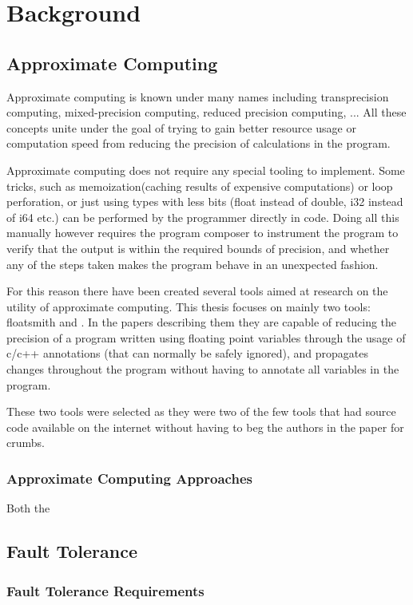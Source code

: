 \section{Background} 

\subsection{Approximate Computing}
Approximate computing is known under many names including transprecision computing, mixed-precision computing, reduced precision computing, ...
All these concepts unite under the goal of trying to gain better resource usage or computation speed from reducing the precision of calculations in the program. 

Approximate computing does not require any special tooling to implement. Some tricks, such as memoization(caching results of expensive computations) or loop perforation, or just using types with less bits (float instead of double, i32 instead of i64 etc.) can be performed by the programmer directly in code. Doing all this manually however requires the program composer to instrument the program to verify that the output is within the required bounds of precision, and whether any of the steps taken makes the program behave in an unexpected fashion.

For this reason there have been created several tools aimed at research on the utility of approximate computing. 
This thesis focuses on mainly two tools: floatsmith and \taffo. In the papers describing them they are capable of reducing the precision of a program written using floating point variables through the usage of c/c++ annotations (that can normally be safely ignored), and propagates changes throughout the program without having to annotate all variables in the program.

These two tools were selected as they were two of the few tools that had source code available on the internet without having to beg the authors in the paper for crumbs. 

\subsubsection{Approximate Computing Approaches}

Both the 

\subsection{Fault Tolerance}

\subsubsection{Fault Tolerance Requirements}